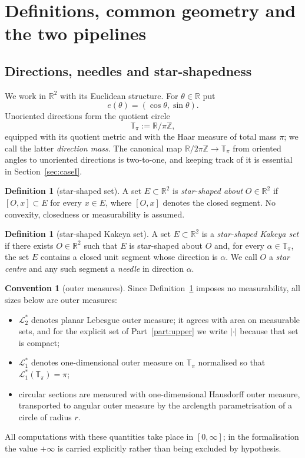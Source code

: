 \documentclass[11pt]{article}
\theoremstyle{plain}
\theoremstyle{definition}
\newtheorem{definition}[theorem]{Definition}
\newtheorem{convention}[theorem]{Convention}
\theoremstyle{remark}
\newcommand{\R}{\mathbb{R}}
\newcommand{\Z}{\mathbb{Z}}
\newcommand{\Tp}{\mathbb{T}_{\pi}}
\newcommand{\Lout}{\mathcal{L}^{*}_{2}}
\newcommand{\Lone}{\mathcal{L}^{*}_{1}}
\begin{document}
\section{Definitions, common geometry and the two pipelines}\label{sec:defs}

\subsection{Directions, needles and star-shapedness}

We work in $\R^{2}$ with its Euclidean structure. For $\theta\in\R$ put
\[
  e(\theta)=(\cos\theta,\sin\theta).
\]
Unoriented directions form the quotient circle
\begin{equation}\label{eq:projcircle}
  \Tp:=\R/\pi\Z ,
\end{equation}
equipped with its quotient metric and with the Haar measure of total mass $\pi$;
we call the latter \emph{direction mass}. The canonical map
$\R/2\pi\Z\to\Tp$ from oriented angles to unoriented directions is two-to-one,
and keeping track of it is essential in Section~\ref{sec:caseI}.

\begin{definition}[star-shaped set]
A set $E\subset\R^{2}$ is \emph{star-shaped about} $O\in\R^{2}$ if
$[O,x]\subset E$ for every $x\in E$, where $[O,x]$ denotes the closed segment.
No convexity, closedness or measurability is assumed.
\end{definition}

\begin{definition}[star-shaped Kakeya set]\label{def:ssk}
A set $E\subset\R^{2}$ is a \emph{star-shaped Kakeya set} if there exists
$O\in\R^{2}$ such that $E$ is star-shaped about $O$ and, for every
$\alpha\in\Tp$, the set $E$ contains a closed unit segment whose direction is
$\alpha$. We call $O$ a \emph{star centre} and any such segment a \emph{needle}
in direction $\alpha$.
\end{definition}

\begin{convention}[outer measures]\label{conv:outer}
Since Definition~\ref{def:ssk} imposes no measurability, all sizes below are
outer measures:
\begin{itemize}
  \item $\Lout$ denotes planar Lebesgue outer measure; it agrees with area on
    measurable sets, and for the explicit set of Part~\ref{part:upper} we write
    $|\cdot|$ because that set is compact;
  \item $\Lone$ denotes one-dimensional outer measure on $\Tp$ normalised so
    that $\Lone(\Tp)=\pi$;
  \item circular sections are measured with one-dimensional Hausdorff outer
    measure, transported to angular outer measure by the arclength
    parametrisation of a circle of radius $r$.
\end{itemize}
All computations with these quantities take place in $[0,\infty]$; in the
formalisation the value $+\infty$ is carried explicitly rather than being
excluded by hypothesis.
\end{convention}
\end{document}
